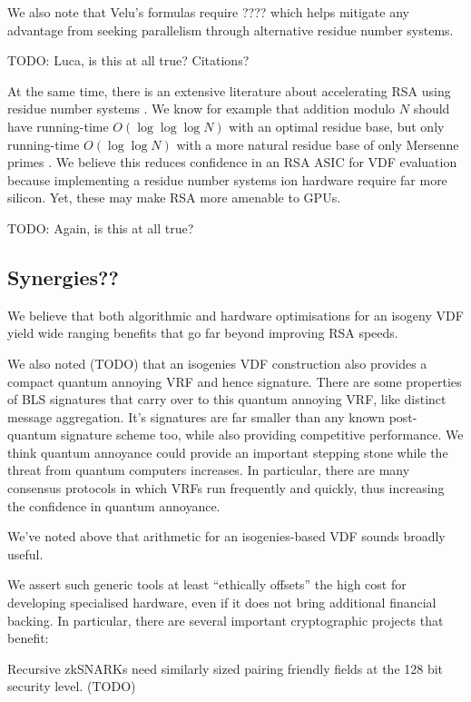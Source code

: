 \documentclass{article}
\begin{document}
We also note that Velu's formulas require ???? which helps mitigate
any advantage from seeking parallelism through alternative residue
number systems.

TODO:  Luca, is this at all true?  Citations?

At the same time, there is an extensive literature about accelerating
RSA using residue number systems \cite{????}.
We know for example that addition modulo $N$ should have running-time
$O(\log \log \log N)$ with an optimal residue base, but only
running-time $O(\log \log N)$ with a more natural residue base of only
Mersenne primes \cite[\S4.6]{Parhami}.  
We believe this reduces confidence in an RSA ASIC for VDF evaluation
because implementing a residue number systems ion hardware require far
more silicon.  Yet, these may make RSA more amenable to GPUs.

TODO: Again, is this at all true? 

\subsection{Synergies??}

We believe that both algorithmic and hardware optimisations for an
isogeny VDF yield wide ranging benefits that go far beyond improving
RSA speeds.

We also noted (TODO) that an isogenies VDF construction also provides
a compact quantum annoying VRF and hence signature.  There are some
properties of BLS signatures that carry over to this quantum annoying
VRF, like distinct message aggregation.  It's signatures are far
smaller than any known post-quantum signature scheme too, while also
providing competitive performance.  We think quantum annoyance could
provide an important stepping stone while the threat from quantum
computers increases. In particular, there are many consensus protocols
in which VRFs run frequently and quickly, thus increasing the confidence
in quantum annoyance.  

We've noted above that arithmetic for an isogenies-based VDF sounds
broadly useful.

We assert such generic tools at least ``ethically offsets'' the
high cost for developing specialised hardware, even if it does not
bring additional financial backing.  In particular, there are several
important cryptographic projects that benefit: 

Recursive zkSNARKs need similarly sized pairing friendly fields at
the 128 bit security level.  (TODO)
\end{document}
